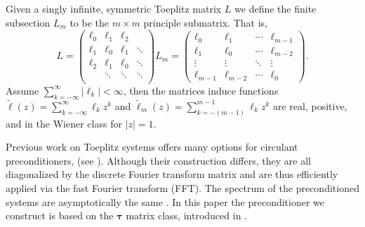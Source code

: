 \documentclass[review]{siamart251216}
\newcommand{\Toe}{{ L }}
\newcommand{\toe}{{ \ell }}
\newcommand{\toef}{{ \tilde{\toe}}}
\newcommand{\ptau}{{\bm{\tau}}}
\begin{document}
\begin{definition}
	Given a singly infinite, symmetric Toeplitz matrix $\Toe$ we define the finite subsection $\Toe_m$ to be the $m \times m$ principle submatrix. That is, 
	\begin{equation*}
		\Toe = \begin{pmatrix}
			\toe_0 & \toe_1 & \toe_2 & \\
			\toe_1 & \toe_0 & \toe_1 &  \ddots \\
			\toe_2 & \toe_1 & \toe_0 & \ddots  \\
			& \ddots & \ddots & \ddots  \\
		\end{pmatrix}
				\Toe_m = \begin{pmatrix}
			\toe_0 & \toe_1 & \cdots & \toe_{m-1} \\
			\toe_1 & \toe_0 & \cdots & \toe_{m-2} \\
			\vdots & \vdots & \ddots & \vdots \\
			\toe_{m-1} & \toe_{m-2} & \cdots & \toe_0 
		\end{pmatrix}.
	\end{equation*}
	Assume $\sum_{k=-\infty}^{\infty} |\toe_k| <\infty$, then the matrices induce functions $\toef(z) = \sum_{k=-\infty}^{\infty} \toe_k z^k$ and $\toef_m(z) = \sum_{k=-(m-1)}^{m-1} \toe_k z^k$ are real, positive, and in the Wiener class for $|z| = 1$.
\end{definition}

Previous work on Toeplitz systems offers many options for circulant preconditioners, (see \cite{precond_review}). Although their construction differs, they are all diagonalized by the discrete Fourier transform matrix and are thus efficiently applied via the fast Fourier transform (FFT). The spectrum of the preconditioned systems are asymptotically the same \cite{precond_review}. In this paper the preconditioner we construct is based on the $\ptau$ matrix class, introduced in \cite{Bini}. 
\end{document}
